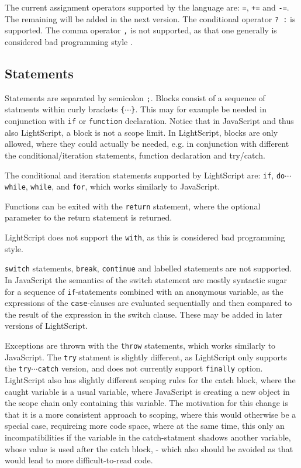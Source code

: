 \documentclass[11pt]{report}
\begin{document}
The current assignment operators supported by the language are: \verb|=|, \verb|+=| and \verb|-=|.
The remaining will be added in the next version.
The conditional operator \verb|? :| is supported. The comma operator \verb|,| is not supported, as that one generally is considered bad programming style \cite{crockford-comma}.

\subsection{Statements}
Statements are separated by semicolon \verb|;|.
Blocks consist of a sequence of statments within curly brackets \verb|{|$\cdots$\verb|}|. This may for example be needed in conjunction with \verb|if| or \verb|function| declaration. Notice that in JavaScript and thus also LightScript, a block is not a scope limit. In LightScript, blocks are only allowed, where they could actually be needed, e.g. in conjunction with different the conditional/iteration statements, function declaration and try/catch.

The conditional and iteration statements supported by LightScript are: \verb|if|, \verb|do|$\cdots$\verb|while|, \verb|while|, and \verb|for|, which works similarly to JavaScript.

Functions can be exited with the \verb|return| statement, where the optional parameter to the return statement is returned.

LightScript does not support the \verb|with|, as this is considered bad programming style.

\verb|switch| statements, \verb|break|, \verb|continue| and labelled statements are not supported. In JavaScript the semantics of the switch statement are mostly syntactic sugar for a sequence of \verb|if|-statements combined with an anonymous variable, as the expressions of the \verb|case|-clauses are evaluated sequentially and then compared to the result of the expression in the switch clause.
These may be added in later versions of LightScript.

Exceptions are thrown with the \verb|throw| statements, which works similarly to JavaScript.
The \verb|try| statment is slightly different, as LightScript only supports the \verb|try|$\cdots$\verb|catch| version, and does not currently support \verb|finally| option.
LightScript also has slightly different scoping rules for the catch block, where the caught variable is a usual variable, where JavaScript is creating a new object in the scope chain only containing this variable. The motivation for this change is that it is a more consistent approach to scoping, where this would otherwise be a special case, requireing more code space, where at the same time, this only an incompatibilities if the variable in the catch-statment shadows another variable, whose value is used after the catch block, - which also should be avoided as that would lead to more difficult-to-read code.
\end{document}
